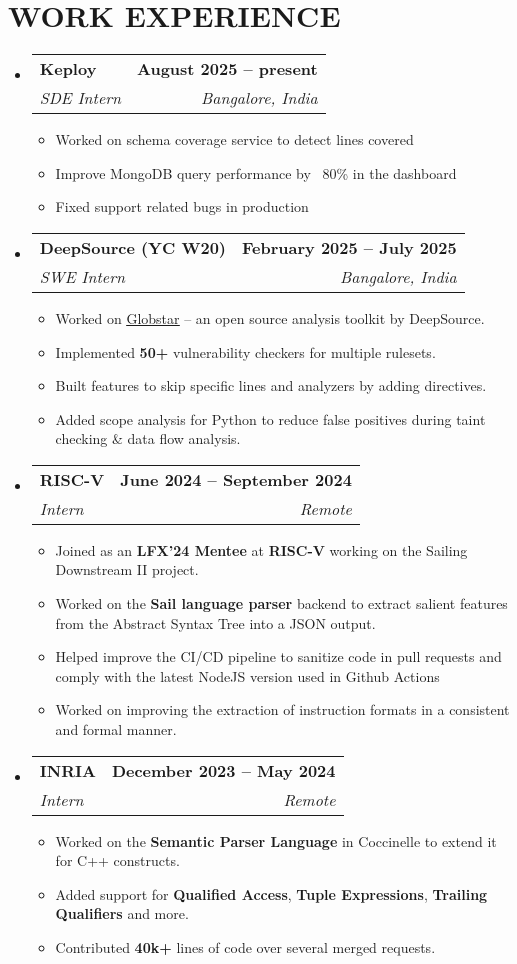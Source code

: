 \documentclass[letterpaper,11pt]{article}
\makeatletter
\newcommand{\resumeItem}[1]{
  \item\small{
    {#1 \vspace{-2pt}}
  }
}
\newcommand{\resumeSubheading}[4]{
  \vspace{-2pt}\item
    \begin{tabular*}{1.0\textwidth}[t]{l@{\extracolsep{\fill}}r}
      \textbf{#1} & \textbf{\small #2} \\
      \textit{\small#3} & \textit{\small #4} \\
    \end{tabular*}\vspace{-7pt}
}
\newcommand{\resumeSubHeadingListStart}{\begin{itemize}[leftmargin=0.0in, label={}]}
\newcommand{\resumeSubHeadingListEnd}{\end{itemize}}
\newcommand{\resumeItemListStart}{\begin{itemize}}
\newcommand{\resumeItemListEnd}{\end{itemize}\vspace{-5pt}}
\makeatother
\begin{document}
\section{WORK EXPERIENCE}
  \resumeSubHeadingListStart
    \resumeSubheading{Keploy}{August 2025 -- present}{SDE Intern}{Bangalore, India}
    \resumeItemListStart
        \resumeItem{Worked on schema coverage service to detect lines covered}
        \resumeItem{Improve MongoDB query performance by ~80\% in the dashboard}
        \resumeItem{Fixed support related bugs in production}
    \resumeItemListEnd
    \resumeSubheading{DeepSource (YC W20)}{February 2025 -- July 2025}{SWE Intern}{Bangalore, India}
    \resumeItemListStart
        \resumeItem{Worked on \href{https://globstar.dev}{\underline{Globstar}} -- an open source analysis toolkit by DeepSource.}
        \resumeItem{Implemented \textbf{50+} vulnerability checkers for multiple rulesets.}
        \resumeItem{Built features to skip specific lines and analyzers by adding directives.}
        \resumeItem{Added scope analysis for Python to reduce false positives during taint checking \& data flow analysis.}
    \resumeItemListEnd
    \resumeSubheading{RISC-V}{June 2024 -- September 2024}{Intern}{Remote}
    \resumeItemListStart
        \resumeItem{Joined as an \textbf{LFX'24 Mentee} at \textbf{RISC-V} working on the Sailing Downstream II project.}
        \resumeItem{Worked on the \textbf{Sail language parser} backend to extract salient features from the Abstract Syntax Tree into a JSON output.}
        \resumeItem{Helped improve the CI/CD pipeline to sanitize code in pull requests and comply with the latest NodeJS version used in Github Actions}
        \resumeItem{Worked on improving the extraction of instruction formats in a consistent and formal manner.}
    \resumeItemListEnd
    \resumeSubheading
      {INRIA}{December 2023 -- May 2024}
      {Intern}{Remote}
      \resumeItemListStart
        \resumeItem{Worked on the \textbf{Semantic Parser Language} in Coccinelle to extend it for C++ constructs.}
        \resumeItem{Added support for \textbf{Qualified Access}, \textbf{Tuple Expressions}, \textbf{Trailing Qualifiers} and more.}
        \resumeItem{Contributed \textbf{40k+} lines of code over several merged requests.}
      \resumeItemListEnd    
  \resumeSubHeadingListEnd
\vspace{-8pt}
\end{document}
